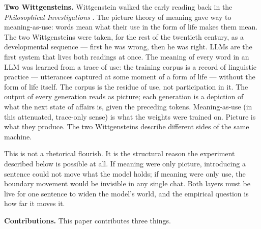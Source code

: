 \documentclass[11pt,a4paper]{article}
\begin{document}
\textbf{Two Wittgensteins.} Wittgenstein walked the early reading back in the \textit{Philosophical Investigations} \citep{wittgenstein1953philosophical}. The picture theory of meaning gave way to meaning-as-use: words mean what their use in the form of life makes them mean. The two Wittgensteins were taken, for the rest of the twentieth century, as a developmental sequence --- first he was wrong, then he was right. LLMs are the first system that lives both readings at once. The meaning of every word in an LLM was learned from a trace of use: the training corpus is a record of linguistic practice --- utterances captured at some moment of a form of life --- without the form of life itself. The corpus is the residue of use, not participation in it. The output of every generation reads as picture; each generation is a depiction of what the next state of affairs is, given the preceding tokens. Meaning-as-use (in this attenuated, trace-only sense) is what the weights were trained on. Picture is what they produce. The two Wittgensteins describe different sides of the same machine.

This is not a rhetorical flourish. It is the structural reason the experiment described below is possible at all. If meaning were only picture, introducing a sentence could not move what the model holds; if meaning were only use, the boundary movement would be invisible in any single chat. Both layers must be live for one sentence to widen the model's world, and the empirical question is how far it moves it.

\textbf{Contributions.} This paper contributes three things.
\end{document}
